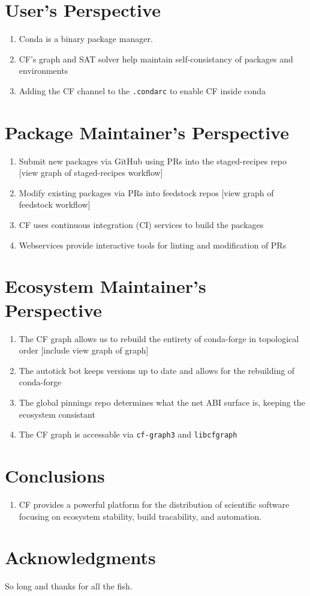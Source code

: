 \documentclass[fleqn,10pt,lineno]{wlpeerj} %
\begin{document}
\section*{User's Perspective}
\begin{enumerate}
\item Conda is a binary package manager.
\item CF's graph and SAT solver help maintain self-consistancy of
packages and environments
\item Adding the CF channel to the \texttt{.condarc} to enable CF
inside conda
\end{enumerate}

\section*{Package Maintainer's Perspective}
\begin{enumerate}
\item Submit new packages via GitHub using PRs into the staged-recipes repo 
[view graph of staged-recipes workflow]
\item Modify existing packages via PRs into feedstock repos [view graph of 
feedstock workflow]
\item CF uses continuous integration (CI) services to build the packages
\item Webservices provide interactive tools for linting and modification of PRs
\end{enumerate}

\section*{Ecosystem Maintainer's Perspective}
\begin{enumerate}
\item The CF graph allows us to rebuild the entirety of conda-forge in 
topological order [include view graph of graph]
\item The autotick bot keeps versions up to date and allows for the 
rebuilding of conda-forge
\item The global pinnings repo determines what the net ABI surface is, 
keeping the ecosystem consistant
\item The CF graph is accessable via \texttt{cf-graph3} and \texttt{libcfgraph}
\end{enumerate}


\section*{Conclusions}
\begin{enumerate}
\item CF provides a powerful platform for the distribution of scientific 
software focusing on ecosystem stability, build tracability, and automation.
\end{enumerate}


\section*{Acknowledgments}

So long and thanks for all the fish.


\end{document}
